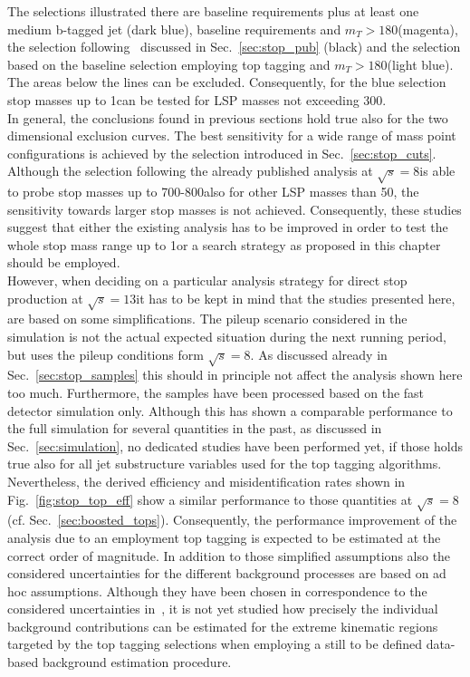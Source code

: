 The selections illustrated there are baseline requirements plus at least one medium b-tagged jet (dark blue), baseline requirements and $m_T > 180$\gev (magenta), the selection following~\cite{CMS-PAS-SUS-13-015} discussed in Sec.~\ref{sec:stop_pub} (black) and the selection based on the baseline selection employing top tagging and $m_T > 180$\gev (light blue). The areas below the lines can be excluded. Consequently, for the blue selection stop masses up to 1\tev can be tested for LSP masses not exceeding 300\gev. \\
In general, the conclusions found in previous sections hold true also for the two dimensional exclusion curves. The best sensitivity for a wide range of mass point configurations is achieved by the selection introduced in Sec.~\ref{sec:stop_cuts}. Although the selection following the already published analysis at $\sqrt{s} = 8$\tev is able to probe stop masses up to 700-800\gev also for other LSP masses than 50\gev, the sensitivity towards larger stop masses is not achieved. Consequently, these studies suggest that either the existing analysis has to be improved in order to test the whole stop mass range up to 1\tev or a search strategy as proposed in this chapter should be employed. \\
However, when deciding on a particular analysis strategy for direct stop production at $\sqrt{s} = 13$\tev it has to be kept in mind that the studies presented here, are based on some simplifications.  The pileup scenario considered in the simulation is not the actual expected situation during the next running period, but uses the pileup conditions form $\sqrt{s} = 8$\tev. As discussed already in Sec.~\ref{sec:stop_samples} this should in principle not affect the analysis shown here too much. Furthermore, the samples have been processed based on the fast detector simulation only. Although this has shown a comparable performance to the full simulation for several quantities in the past, as discussed in Sec.~\ref{sec:simulation}, no dedicated studies have been performed yet, if those holds true also for all jet substructure variables used for the top tagging algorithms. Nevertheless, the derived efficiency and misidentification rates shown in Fig.~\ref{fig:stop_top_eff} show a similar performance to those quantities at $\sqrt{s} = 8$\tev (cf. Sec.~\ref{sec:boosted_tops}). Consequently, the performance improvement of the analysis due to an employment top tagging is expected to be estimated at the correct order of magnitude. In addition to those simplified assumptions also the considered uncertainties for the different background processes are based on ad hoc assumptions. Although they have been chosen in correspondence to the considered uncertainties in~\cite{CMS-PAS-SUS-13-015}, it is not yet studied how precisely the individual background contributions can be estimated for the extreme kinematic regions targeted by the top tagging selections when employing a still to be defined data-based background estimation procedure. \\
